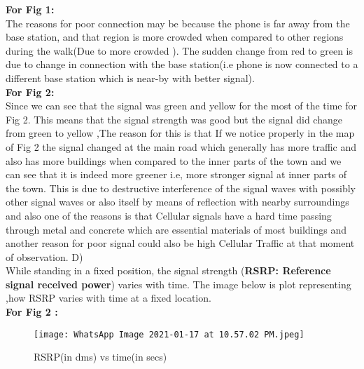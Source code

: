 \documentclass[11pt,a4paper]{article}
\begin{document}
 \vspace{0.5cm}
\textbf{For Fig 1:}\\
 The reasons for poor connection may be because the phone is far away from the base station, and that region is more crowded when compared to other regions during the walk(Due to more crowded ). The sudden change from red to green is due to change in connection with the base station(i.e phone is now connected to a different base station which is near-by with better signal).
\\
\vspace{1cm}
\textbf{For Fig 2:}\\
Since we can see that the signal was green and yellow for the most of 
the time for Fig 2. This means that the signal strength 
was good but the signal did change from green to yellow ,The reason for this is that If we
notice properly in the map of Fig 2 the signal changed at the main road which generally 
has more traffic  and also has more
buildings when compared to the inner parts of the town and we can see that it is indeed 
more greener i.e, more stronger signal at inner parts of the town. This is due to destructive
interference of the signal waves with possibly other
signal waves or also itself by means of reflection with nearby surroundings and also one of the
reasons is that  Cellular signals have a hard time passing through 
metal and concrete which are essential materials of most buildings and another reason for poor signal could also 
be high Cellular Traffic at that moment of observation.
\vspace{8pt}
\newpage
{\huge D)}\\

\vspace{0.5cm}
 While standing in a fixed position, the signal strength (\textbf{RSRP: Reference signal received power}) varies with time. The image below is plot representing ,how RSRP varies with time at a fixed location.\\
\textbf{For Fig 2 :}\\
\begin{SCfigure}[0.5][h]
    \centering
\caption{RSRP(in dms) vs time(in secs)}
\texttt{[image: WhatsApp Image 2021-01-17 at 10.57.02 PM.jpeg]}
\end{SCfigure}
\end{document}
